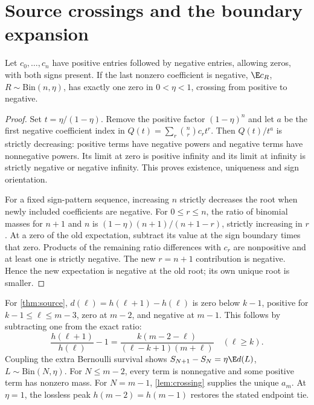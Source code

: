 \section{Source crossings and the boundary expansion}\label{app:source}
\begin{lemma}\label{lem:crossing}
Let $c_0,\ldots,c_n$ have positive entries followed by negative entries, allowing zeros, with both signs present. If the last nonzero coefficient is negative, $\E c_R$, $R\sim\mathrm{Bin}(n,\eta)$, has exactly one zero in $0<\eta<1$, crossing from positive to negative.
\end{lemma}
\begin{proof}
Set $t=\eta/(1-\eta)$. Remove the positive factor $(1-\eta)^n$ and let $a$ be the first negative coefficient index in $Q(t)=\sum_r\binom nr c_rt^r$. Then $Q(t)/t^a$ is strictly decreasing: positive terms have negative powers and negative terms have nonnegative powers. Its limit at zero is positive infinity and its limit at infinity is strictly negative or negative infinity. This proves existence, uniqueness and sign orientation.

For a fixed sign-pattern sequence, increasing $n$ strictly decreases the root when newly included coefficients are negative. For $0\le r\le n$, the ratio of binomial masses for $n+1$ and $n$ is $(1-\eta)(n+1)/(n+1-r)$, strictly increasing in $r$. At a zero of the old expectation, subtract its value at the sign boundary times that zero. Products of the remaining ratio differences with $c_r$ are nonpositive and at least one is strictly negative. The new $r=n+1$ contribution is negative. Hence the new expectation is negative at the old root; its own unique root is smaller.
\end{proof}

For \cref{thm:source}, $d(\ell)=h(\ell+1)-h(\ell)$ is zero below $k-1$, positive for $k-1\le\ell\le m-3$, zero at $m-2$, and negative at $m-1$. This follows by subtracting one from the exact ratio:
\begin{equation}
 \frac{h(\ell+1)}{h(\ell)}-1=\frac{k(m-2-\ell)}{(\ell-k+1)(m+\ell)}\quad(\ell\ge k).
\end{equation}
Coupling the extra Bernoulli survival shows $S_{N+1}-S_N=\eta\E d(L)$, $L\sim\mathrm{Bin}(N,\eta)$. For $N\le m-2$, every term is nonnegative and some positive term has nonzero mass. For $N=m-1$, \cref{lem:crossing} supplies the unique $a_m$. At $\eta=1$, the lossless peak $h(m-2)=h(m-1)$ restores the stated endpoint tie.

